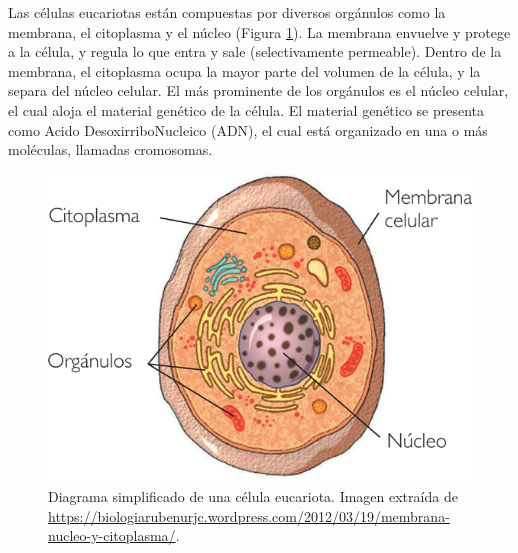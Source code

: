 \documentclass[12pt,twoside]{reedthesis}
\begin{document}
Las células eucariotas están compuestas por diversos orgánulos como la membrana, el citoplasma y el núcleo (Figura \ref{fig:cell}). La membrana envuelve y protege a la célula, y regula lo que entra y sale (selectivamente permeable). Dentro de la membrana, el citoplasma ocupa la mayor parte del volumen de la célula, y la separa del núcleo celular. El más prominente de los orgánulos es el núcleo celular, el cual aloja el material genético de la célula. El material genético se presenta como Acido DesoxirriboNucleico (ADN), el cual está organizado en una o más moléculas, llamadas cromosomas.
\begin{figure}

{\centering \includegraphics[width=0.7\linewidth]{images/celula} 

}

\caption{Diagrama simplificado de una célula eucariota. Imagen extraída de \url{https://biologiarubenurjc.wordpress.com/2012/03/19/membrana-nucleo-y-citoplasma/}.}\label{fig:cell}
\end{figure}
\end{document}
